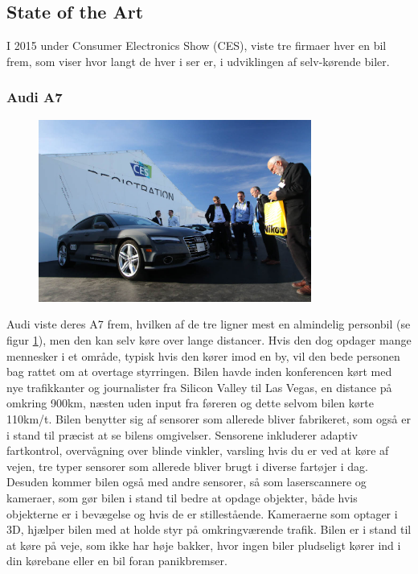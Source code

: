 \subsection{State of the Art} 
I 2015 under Consumer Electronics Show (CES), viste tre firmaer hver en bil frem, som viser hvor langt de hver i ser er, i udviklingen af selv-kørende biler.\cite{CES}

\subsubsection{Audi A7}
\begin{figure}[h!]
	\centering
	\includegraphics[width=0.8\textwidth]{images/150106_0345_ces.jpg}
	\label{fig:Audi_A7}
\end{figure}
Audi viste deres A7 frem, hvilken af de tre ligner mest en almindelig personbil (se figur \ref{fig:Audi_A7}), men den kan selv køre over lange distancer. Hvis den dog opdager mange mennesker i et område, typisk hvis den kører imod en by, vil den bede personen bag rattet om at overtage styrringen. Bilen havde inden konferencen kørt med nye trafikkanter og journalister fra Silicon Valley til Las Vegas, en distance på omkring 900km, næsten uden input fra føreren og dette selvom bilen kørte 110km/t. Bilen benytter sig af sensorer som allerede bliver fabrikeret, som også er i stand til præcist at se bilens omgivelser. Sensorene inkluderer adaptiv fartkontrol, overvågning over blinde vinkler, varsling hvis du er ved at køre af vejen, tre typer sensorer som allerede bliver brugt i diverse fartøjer i dag. Desuden kommer bilen også med andre sensorer, så som laserscannere og kameraer, som gør bilen i stand til bedre at opdage objekter, både hvis objekterne er i bevægelse og hvis de er stillestående. Kameraerne som optager i 3D, hjælper bilen med at holde styr på omkringværende trafik. Bilen er i stand til at køre på veje, som ikke har høje bakker, hvor ingen biler pludseligt kører ind i din kørebane eller en bil foran panikbremser.

